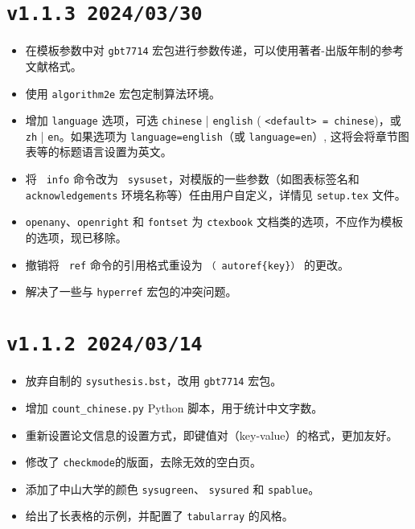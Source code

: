 \section*{\texttt{v1.1.3 2024/03/30}}
\begin{itemize}
    \item 在模板参数中对 \texttt{gbt7714} 宏包进行参数传递，可以使用著者-出版年制的参考文献格式。
    \item 使用 \texttt{algorithm2e} 宏包定制算法环境。
    \item 增加 \texttt{language} 选项，可选 \texttt{chinese} | \texttt{english} ( \texttt{<default> = chinese})，或 \texttt{zh} | \texttt{en}。如果选项为 \texttt{language=english}（或 \texttt{language=en}）, 这将会将章节图表等的标题语言设置为英文。
    \item 将 \texttt{ info} 命令改为 \texttt{ sysuset}，对模版的一些参数（如图表标签名和 \\ \texttt{acknowledgements} 环境名称等）任由用户自定义，详情见 \texttt{setup.tex} 文件。
    \item \texttt{openany}、\texttt{openright} 和 \texttt{fontset} 为 \texttt{ctexbook} 文档类的选项，不应作为模板的选项，现已移除。
    \item 撤销将 \texttt{ ref} 命令的引用格式重设为 \texttt{（ autoref\{key\}）} 的更改。
    \item 解决了一些与 \texttt{hyperref} 宏包的冲突问题。
\end{itemize}

\section*{\texttt{v1.1.2 2024/03/14}}
\begin{itemize}
    \item 放弃自制的 \texttt{sysuthesis.bst}，改用 \texttt{gbt7714} 宏包。
    \item 增加  \texttt{count\_chinese.py} Python 脚本，用于统计中文字数。
    \item 重新设置论文信息的设置方式，即键值对（key-value）的格式，更加友好。
    \item 修改了 \texttt{checkmode}的版面，去除无效的空白页。
    \item 添加了中山大学的颜色 \texttt{sysugreen}、 \texttt{sysured} 和 \texttt{spablue}。
    \item 给出了长表格的示例，并配置了 \texttt{tabularray} 的风格。
\end{itemize}

